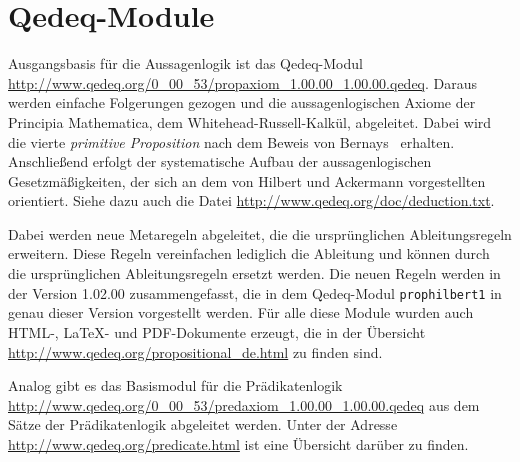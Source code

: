 \documentclass[a4paper,german,10pt,twoside]{book}
\begin{document}
{\section{Qedeq-Module}
Ausgangsbasis f{\"u}r die Aussagenlogik ist das Qedeq-Modul
\url{http://www.qedeq.org/0_00_53/propaxiom_1.00.00_1.00.00.qedeq}. Daraus werden einfache
Folgerungen gezogen und die aussagenlogischen Axiome der Principia Mathematica, dem Whitehead-Russell-Kalk{\"u}l, abgeleitet. Dabei wird die vierte \emph{primitive
Proposition} nach dem Beweis von Bernays~\cite{bernays} erhalten. Anschlie{\ss}end erfolgt der
systematische Aufbau der aussagenlogischen Gesetzm{\"a}{\ss}igkeiten, der sich an dem von Hilbert und
Ackermann \cite{hilback} vorgestellten orientiert. Siehe dazu auch die Datei
\url{http://www.qedeq.org/doc/deduction.txt}.
\par
Dabei werden neue Metaregeln abgeleitet, die die urspr{\"u}nglichen Ableitungsregeln erweitern. Diese
Regeln vereinfachen lediglich die Ableitung und k{\"o}nnen durch die urspr{\"u}nglichen Ableitungsregeln
ersetzt werden. Die neuen Regeln werden in der Version 1.02.00 zusammengefasst, die in dem
Qedeq-Modul {\tt prophilbert1} in genau dieser Version vorgestellt werden. F{\"u}r alle diese Module
wurden auch HTML-, \LaTeX{}- und PDF-Dokumente erzeugt, die in der {\"U}bersicht
\url{http://www.qedeq.org/propositional_de.html} zu finden sind.
\par
Analog gibt es das Basismodul f{\"u}r die Pr{\"a}dikatenlogik
\url{http://www.qedeq.org/0_00_53/predaxiom_1.00.00_1.00.00.qedeq} aus dem S{\"a}tze der
Pr{\"a}dikatenlogik abgeleitet werden. Unter der Adresse \url{http://www.qedeq.org/predicate.html} ist
eine {\"U}bersicht dar{\"u}ber zu finden.

}
\end{document}
